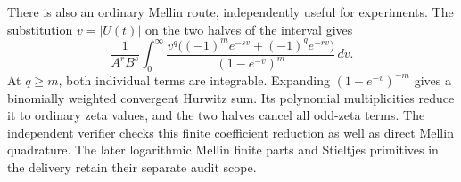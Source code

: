 There is also an ordinary Mellin route, independently useful for experiments.
The substitution $v=|U(t)|$ on the two halves of the interval gives
\[
 \frac1{A^rB^s}\int_0^\infty
 \frac{v^q\bigl((-1)^m e^{-sv}+(-1)^q e^{-rv}\bigr)}
                         {(1-e^{-v})^m}\,dv.
\]
At $q\ge m$, both individual terms are integrable. Expanding
$(1-e^{-v})^{-m}$ gives a binomially weighted convergent Hurwitz sum.
Its polynomial multiplicities reduce it to ordinary zeta values, and
the two halves cancel all odd-zeta terms. The independent verifier checks
this finite coefficient reduction as well as direct Mellin quadrature.
The later logarithmic Mellin finite parts and Stieltjes primitives in the
delivery retain their separate audit scope.
